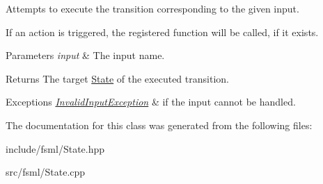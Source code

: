 Attempts to execute the transition corresponding to the given input. 

If an action is triggered, the registered function will be called, if it exists. 
\begin{DoxyParams}{Parameters}
{\em input} & The input name. \\
\hline
\end{DoxyParams}
\begin{DoxyReturn}{Returns}
The target \hyperlink{classfsml_1_1State}{State} of the executed transition. 
\end{DoxyReturn}

\begin{DoxyExceptions}{Exceptions}
{\em \hyperlink{structfsml_1_1InvalidInputException}{Invalid\-Input\-Exception}} & if the input cannot be handled. \\
\hline
\end{DoxyExceptions}


The documentation for this class was generated from the following files\-:\begin{DoxyCompactItemize}
\item 
include/fsml/State.\-hpp\item 
src/fsml/State.\-cpp\end{DoxyCompactItemize}
